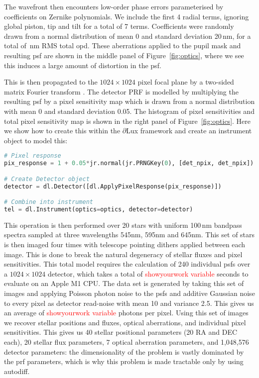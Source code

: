 \documentclass[]{spieman}
\begin{document}
The wavefront then encounters low-order phase errors parameterised by coefficients on Zernike polynomials. We include the first 4 radial terms, ignoring global piston, tip and tilt for a total of 7 terms. Coefficients were randomly drawn from a normal distribution of mean 0 and standard deviation 20\,nm, for a total of \,nm RMS total \ac{opd}. These aberrations applied to the pupil mask and resulting \ac{psf} are shown in the middle panel of Figure~\ref{fig:optics}, where we see this induces a large amount of distortion in the \ac{psf}.

This is then propagated to the $1024\times1024$ pixel focal plane by a two-sided matrix Fourier transform \cite{Soummer2007,Martinache2020}. The detector PRF is modelled by multiplying the resulting \ac{psf} by a pixel sensitivity map which is drawn from a normal distribution with mean 0 and standard deviation 0.05. The histogram of pixel sensitivities and total pixel sensitivity map is shown in the right panel of Figure~\ref{fig:optics}. Here we show how to create this within the $\partial$Lux framework and create an instrument object to model this:

\begin{lstlisting}[language=Python]
# Pixel response
pix_response = 1 + 0.05*jr.normal(jr.PRNGKey(0), [det_npix, det_npix])

# Create Detector object
detector = dl.Detector([dl.ApplyPixelResponse(pix_response)])

# Combine into instrument
tel = dl.Instrument(optics=optics, detector=detector)
\end{lstlisting}

This operation is then performed over 20 stars with uniform 100\,nm bandpass spectra sampled at three wavelengths 545nm, 595nm and 645nm. This set of stars is then imaged four times with telescope pointing dithers applied between each image. This is done to break the natural degeneracy of stellar fluxes and pixel sensitivities. This total model requires the calculation of 240 individual \ac{psf}s over a $1024\times1024$ detector, which takes a total of \textcolor{red}{showyourwork variable} seconds to evaluate on an Apple M1 CPU. The data set is generated by taking this set of images and applying Poisson photon noise to the \ac{psf}s and additive Gaussian noise to every pixel as detector read-noise with mean 10 and variance 2.5. This gives us an average of \textcolor{red}{showyourwork variable} photons per pixel. Using this set of images we recover stellar positions and fluxes, optical aberrations, and individual pixel sensitivities. This gives us 40 stellar positional parameters (20 RA and DEC each), 20 stellar flux parameters, 7 optical aberration parameters, and 1,048,576 detector parameters: the dimensionality of the problem is vastly dominated by the \ac{prf} parameters, which is why this problem is made tractable only by using autodiff.
\end{document}

